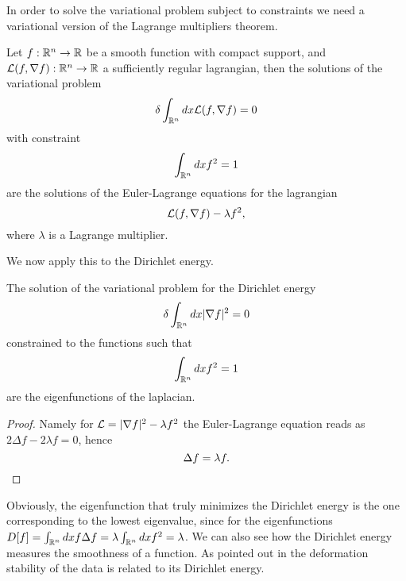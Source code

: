 \documentclass[../2.tex]{subfiles}
\begin{document}
In order to solve the variational problem subject to constraints we need a variational 
version of the Lagrange multipliers theorem.

\begin{prop}
    Let $f:\mathbb{R}^n \to \mathbb{R}$ be a smooth function with compact support, and $\mathcal{L}(f,\nabla f) : \mathbb{R}^n \to \mathbb{R}$ a sufficiently regular lagrangian,
    then the solutions of the variational problem 
    \[ \delta\int_{\mathbb{R}^n} dx \mathcal{L}(f,\nabla f) = 0 \]
    with constraint
    \[ \int_{\mathbb{R}^n} dx f^2 = 1 \]
    are the solutions of the Euler-Lagrange equations for the lagrangian
    \[ \mathcal{L}(f,\nabla f) - \lambda f^2, \]
    where $\lambda$ is a Lagrange multiplier.
\end{prop}

We now apply this to the Dirichlet energy.

\begin{prop}
    The solution of the variational problem for the Dirichlet energy
    \[ \delta\int_{\mathbb{R}^n} dx | \nabla f |^2 = 0 \]
    constrained to the functions such that 
    \[ \int_{\mathbb{R}^n} dx f^2 = 1 \]
    are the eigenfunctions of the laplacian.
\end{prop}
\begin{proof}
    Namely for $\mathcal{L} = |\nabla f|^2-\lambda f^2$ the Euler-Lagrange equation reads as $ 2 \Delta f - 2\lambda f = 0$,
    hence \[ \Delta f = \lambda f . \qedhere \]

\end{proof}

Obviously, the eigenfunction that truly minimizes the Dirichlet energy is the one corresponding to the lowest eigenvalue,
since for the eigenfunctions $D[f] = \int_{\mathbb{R}^n} dx f \Delta f = \lambda \int_{\mathbb{R}^n} dx f^2 = \lambda$. We can also see how the Dirichlet energy
measures the smoothness of a function. As pointed out in \cite{2021geo} the deformation stability of the data is related to its Dirichlet energy.\\
\hfill \\


\end{document}
